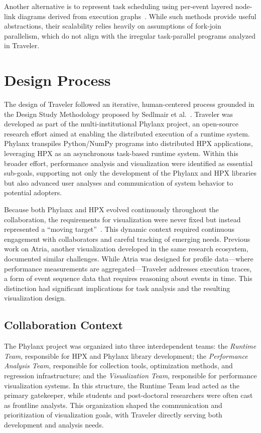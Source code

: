 \begin{refsection}
Another alternative is to represent task scheduling using per-event layered node-link diagrams derived from execution graphs~\cite{Huynh2015DAGViz, Muddukrishna2016GrainGraphs, Reissmann2017GrainGraphs}. While such methods provide useful abstractions, their scalability relies heavily on assumptions of fork-join parallelism, which do not align with the irregular task-parallel programs analyzed in Traveler.

\section{Design Process}
\label{sec:travdesignmethod}

The design of Traveler followed an iterative, human-centered process grounded in the Design Study Methodology proposed by Sedlmair et al.~\cite{Sedlmair2012}. Traveler was developed as part of the multi-institutional Phylanx project, an open-source research effort aimed at enabling the distributed execution of a runtime system. Phylanx transpiles Python/NumPy programs into distributed HPX applications, leveraging HPX as an asynchronous task-based runtime system. Within this broader effort, performance analysis and visualization were identified as essential sub-goals, supporting not only the development of the Phylanx and HPX libraries but also advanced user analyses and communication of system behavior to potential adopters.

Because both Phylanx and HPX evolved continuously throughout the collaboration, the requirements for visualization were never fixed but instead represented a ``moving target''~\cite{williams2020movingtarget}. This dynamic context required continuous engagement with collaborators and careful tracking of emerging needs. Previous work on Atria, another visualization developed in the same research ecosystem, documented similar challenges. While Atria was designed for profile data---where performance measurements are aggregated---Traveler addresses execution traces, a form of event sequence data that requires reasoning about events in time. This distinction had significant implications for task analysis and the resulting visualization design.

\subsection{Collaboration Context}
\label{sec:traveler-collaboration}

The Phylanx project was organized into three interdependent teams: the \textit{Runtime Team}, responsible for HPX and Phylanx library development; the \textit{Performance Analysis Team}, responsible for collection tools, optimization methods, and regression infrastructure; and the \textit{Visualization Team}, responsible for performance visualization systems. In this structure, the Runtime Team lead acted as the primary gatekeeper, while students and post-doctoral researchers were often cast as frontline analysts. This organization shaped the communication and prioritization of visualization goals, with Traveler directly serving both development and analysis needs.


\end{refsection}
